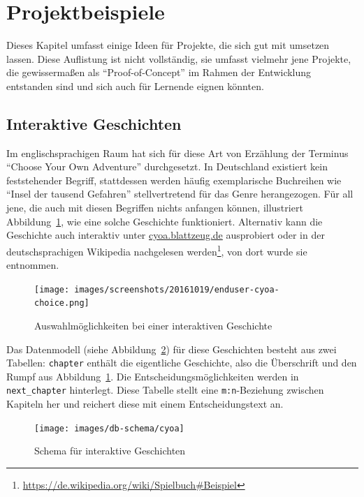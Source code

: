 \section{Projektbeispiele}
\label{sec:project-examples}

Dieses Kapitel umfasst einige Ideen für Projekte, die sich gut mit \idename{} umsetzen lassen. Diese Auflistung ist nicht vollständig, sie umfasst vielmehr jene Projekte, die gewissermaßen als "`Proof-of-Concept"' im Rahmen der Entwicklung entstanden sind und sich auch für Lernende eignen könnten.

\subsection{Interaktive Geschichten}
\label{sec:project-cyoa}

Im englischsprachigen Raum hat sich für diese Art von Erzählung der Terminus "`Choose Your Own Adventure"' durchgesetzt. In Deutschland existiert kein feststehender Begriff, stattdessen werden häufig exemplarische Buchreihen wie "`Insel der tausend Gefahren"' stellvertretend für das Genre herangezogen. Für all jene, die auch mit diesen Begriffen nichts anfangen können, illustriert Abbildung~\ref{fig:enduser-cyoa-choice}, wie eine solche Geschichte funktioniert. Alternativ kann die Geschichte auch interaktiv unter \href{http://cyoa.blattzeug.de/}{cyoa.blattzeug.de} ausprobiert oder in der deutschsprachigen Wikipedia nachgelesen werden\footnote{\url{https://de.wikipedia.org/wiki/Spielbuch\#Beispiel}}, von dort wurde sie entnommen.

\begin{figure}[h]
  \centering \texttt{[image: images/screenshots/20161019/enduser-cyoa-choice.png]}
  \caption{Auswahlmöglichkeiten bei einer interaktiven Geschichte}
  \label{fig:enduser-cyoa-choice}
\end{figure}

Das Datenmodell (siehe Abbildung~\ref{fig:project-cyoa-schema}) für diese Geschichten besteht aus zwei Tabellen: \texttt{chapter} enthält die eigentliche Geschichte, also die Überschrift und den Rumpf aus Abbildung~\ref{fig:enduser-cyoa-choice}. Die Entscheidungsmöglichkeiten werden in \texttt{next\_chapter} hinterlegt. Diese Tabelle stellt eine \texttt{m:n}-Beziehung zwischen Kapiteln her und reichert diese mit einem Entscheidungstext an.

\begin{figure}[h]
  \centering \texttt{[image: images/db-schema/cyoa]}
  \caption{Schema für interaktive Geschichten}
  \label{fig:project-cyoa-schema}
\end{figure}

